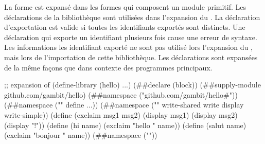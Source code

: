 La forme  est expansé dans les formes qui composent un
module primitif. Les déclarations de la bibliothèque sont utilisées dans
l'expansion du . La déclaration d'exportation est
valide si toutes les identifiants exportés sont distincts.  Une déclaration
 qui exporte un identifiant plusieurs fois cause une erreur de
syntaxe. Les informations les identifiant exporté ne sont pas utilisé lors
l'expansion du , mais lors de l'importation de cette
bibliothèque.  Les déclarations  sont expansées de la même
façons que dans contexte des programmes principaux. \\

\begin{center}
  \begin{mplisting}{0.9}
;; expansion of (define-library (hello) ...)
(##declare (block))
(##supply-module github.com/gambit/hello)
(##namespace ("github.com/gambit/hello#"))
(##namespace ("" define ...))
(##namespace ("" write-shared write display write-simple))
(define (exclaim msg1 msg2)
    (display msg1) (display msg2) (display "!\n"))
(define (hi name) (exclaim "hello " name))
(define (salut name) (exclaim "bonjour " name))
(##namespace (""))
\end{mplisting}
\end{center}

